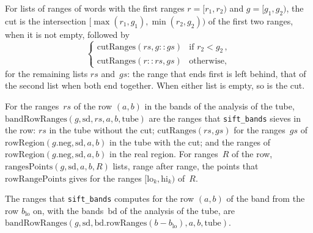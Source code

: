 \begin{definition}\label{def:cutRanges}
  \leanok
  For lists of ranges of words with the first ranges $r = [r_1, r_2)$ and $g = [g_1, g_2)$, the cut
  is the intersection $[\max(r_1, g_1), \min(r_2, g_2))$ of the first two ranges, when it is not
  empty, followed by
  \[ \begin{cases}
       \mathrm{cutRanges}(\mathit{rs}, g :: \mathit{gs}) & \text{if } r_2 < g_2\,, \\
       \mathrm{cutRanges}(r :: \mathit{rs}, \mathit{gs}) & \text{otherwise,}
     \end{cases} \]
  for the remaining lists $\mathit{rs}$ and~$\mathit{gs}$: the range that ends first is left
  behind, that of the second list when both end together. When either list is empty, so is the cut.
\end{definition}

\begin{definition}\label{def:bandRowRanges}
  \leanok
  For the ranges~$\mathit{rs}$ of the row $(a, b)$ in the bands of the analysis of the tube,
  $\mathrm{bandRowRanges}(g, \mathrm{sd}, \mathit{rs}, a, b, \mathrm{tube})$ are the ranges that
  \texttt{sift\_bands} sieves in the row: $\mathit{rs}$ in the tube without the cut;
  $\mathrm{cutRanges}(\mathit{rs}, \mathit{gs})$ for the ranges~$\mathit{gs}$ of
  $\mathrm{rowRegion}(g.\mathrm{neg}, \mathrm{sd}, a, b)$ in the tube with the cut; and the ranges
  of $\mathrm{rowRegion}(g.\mathrm{neg}, \mathrm{sd}, a, b)$ in the real region. For ranges~$R$ of
  the row, $\mathrm{rangesPoints}(g, \mathrm{sd}, a, b, R)$ lists, range after range, the points
  that $\mathrm{rowRangePoints}$ gives for the ranges $[\mathrm{lo}_k, \mathrm{hi}_k)$ of~$R$.
\end{definition}

\begin{lemma}\label{lem:siftBandsRanges_spec}
  \leanok
  The ranges that \texttt{sift\_bands} computes for the row $(a, b)$ of the band from the row
  $b_{\mathrm{lo}}$ on, with the bands~$\mathrm{bd}$ of the analysis of the tube, are
  $\mathrm{bandRowRanges}(g, \mathrm{sd}, \mathrm{bd}.\mathrm{rowRanges}(b - b_{\mathrm{lo}}), a,
  b, \mathrm{tube})$.
\end{lemma}

